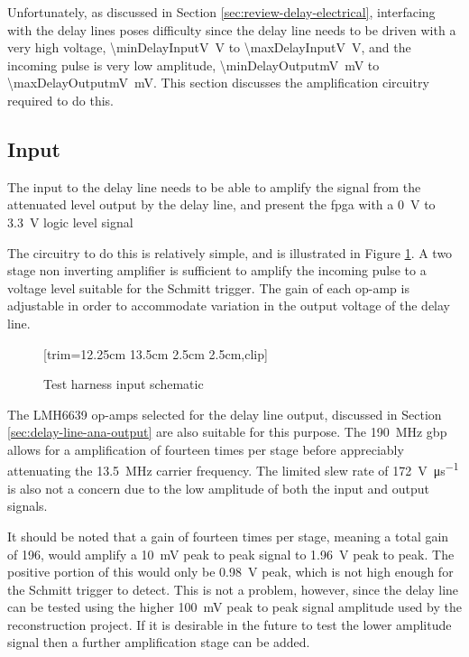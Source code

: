 Unfortunately, as discussed in Section \ref{sec:review-delay-electrical}, interfacing with the delay lines poses difficulty since the delay line needs to be driven with a very high voltage, \SI{\minDelayInputV}{\volt} to \SI{\maxDelayInputV}{\volt}, and the incoming pulse is very low amplitude, \SI{\minDelayOutputmV}{\milli\volt} to \SI{\maxDelayOutputmV}{\milli\volt}. This section discusses the amplification circuitry required to do this.

\subsection{Input}

The input to the delay line needs to be able to amplify the signal from the attenuated level output by the delay line, and present the \gls{fpga} with a \SI{0}{\volt} to \SI{3.3}{\volt} logic level signal

The circuitry to do this is relatively simple, and is illustrated in Figure \ref{fig:test-harness-input-sch}. A two stage non inverting amplifier is sufficient to amplify the incoming pulse to a voltage level suitable for the Schmitt trigger. The gain of each op-amp is adjustable in order to accommodate variation in the output voltage of the delay line.

\begin{figure}[ht]
	\centering
	[trim={12.25cm 13.5cm 2.5cm 2.5cm},clip] %
	\caption{Test harness input schematic}
	\label{fig:test-harness-input-sch}
\end{figure}

The LMH6639 op-amps selected for the delay line output, discussed in Section \ref{sec:delay-line-ana-output} are also suitable for this purpose. The \SI{190}{\mega\hertz} \gls{gbp} allows for a amplification of fourteen times per stage before appreciably attenuating the \SI{13.5}{\mega\hertz} carrier frequency. The limited slew rate of \SI{172}{\volt\per\micro\second} is also not a concern due to the low amplitude of both the input and output signals.

It should be noted that a gain of fourteen times per stage, meaning a total gain of 196, would amplify a \SI{10}{\milli\volt} peak to peak signal to \SI{1.96}{\volt} peak to peak. The positive portion of this would only be \SI{0.98}{\volt} peak, which is not high enough for the Schmitt trigger to detect. This is not a problem, however, since the delay line can be tested using the higher \SI{100}{\milli\volt} peak to peak signal amplitude used by the reconstruction project. If it is desirable in the future to test the lower amplitude signal then a further amplification stage can be added.

